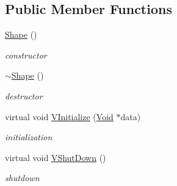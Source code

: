 \subsection*{Public Member Functions}
\begin{DoxyCompactItemize}
\item 
\hypertarget{classContent_1_1Shape_1_1Physics_1_1PhysX_1_1Shape_a4c3897d498dc01ec51fd0facbef44cb9}{
\hyperlink{classContent_1_1Shape_1_1Physics_1_1PhysX_1_1Shape_a4c3897d498dc01ec51fd0facbef44cb9}{Shape} ()}
\label{classContent_1_1Shape_1_1Physics_1_1PhysX_1_1Shape_a4c3897d498dc01ec51fd0facbef44cb9}

\begin{DoxyCompactList}\small\item\em constructor \item\end{DoxyCompactList}\item 
\hypertarget{classContent_1_1Shape_1_1Physics_1_1PhysX_1_1Shape_a03088b764d147db624722dccf9dbea3c}{
\hyperlink{classContent_1_1Shape_1_1Physics_1_1PhysX_1_1Shape_a03088b764d147db624722dccf9dbea3c}{$\sim$Shape} ()}
\label{classContent_1_1Shape_1_1Physics_1_1PhysX_1_1Shape_a03088b764d147db624722dccf9dbea3c}

\begin{DoxyCompactList}\small\item\em destructor \item\end{DoxyCompactList}\item 
\hypertarget{classContent_1_1Shape_1_1Physics_1_1PhysX_1_1Shape_a53fe19ee4d39cd470b3fd59278b443eb}{
virtual void \hyperlink{classContent_1_1Shape_1_1Physics_1_1PhysX_1_1Shape_a53fe19ee4d39cd470b3fd59278b443eb}{VInitialize} (\hyperlink{structVoid}{Void} $\ast$data)}
\label{classContent_1_1Shape_1_1Physics_1_1PhysX_1_1Shape_a53fe19ee4d39cd470b3fd59278b443eb}

\begin{DoxyCompactList}\small\item\em initialization \item\end{DoxyCompactList}\item 
\hypertarget{classContent_1_1Shape_1_1Physics_1_1PhysX_1_1Shape_a38c678a41c84f722883088ade879efdd}{
virtual void \hyperlink{classContent_1_1Shape_1_1Physics_1_1PhysX_1_1Shape_a38c678a41c84f722883088ade879efdd}{VShutDown} ()}
\label{classContent_1_1Shape_1_1Physics_1_1PhysX_1_1Shape_a38c678a41c84f722883088ade879efdd}

\begin{DoxyCompactList}\small\item\em shutdown \item\end{DoxyCompactList}\end{DoxyCompactItemize}
